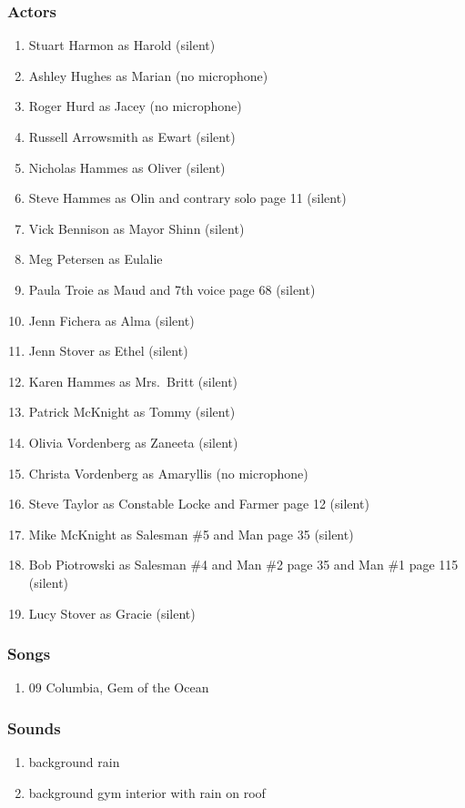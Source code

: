 \subsubsection{Actors}
\begin{enumerate}
\item Stuart Harmon as Harold (silent)
\item Ashley Hughes as Marian (no microphone)
\item Roger Hurd as Jacey (no microphone)
\item Russell Arrowsmith as Ewart (silent)
\item Nicholas Hammes as Oliver (silent)
\item Steve Hammes as Olin and contrary solo page 11 (silent)
\item Vick Bennison as Mayor Shinn (silent)
\item Meg Petersen as Eulalie
\item Paula Troie as Maud and 7th voice page 68 (silent)
\item Jenn Fichera as Alma (silent)
\item Jenn Stover as Ethel (silent)
\item Karen Hammes as Mrs.~Britt (silent)
\item Patrick McKnight as Tommy (silent)
\item Olivia Vordenberg as Zaneeta (silent)
\item Christa Vordenberg as Amaryllis (no microphone)
\item Steve Taylor as Constable Locke and Farmer page 12 (silent)
\item Mike McKnight as Salesman \#5 and Man page 35 (silent)
\item Bob Piotrowski as Salesman \#4 and Man \#2 page 35 and Man \#1 page 115 (silent)
\item Lucy Stover as Gracie (silent)
\end{enumerate}

\subsubsection{Songs}
\begin{enumerate}
\item 09 Columbia, Gem of the Ocean
\end{enumerate}\subsubsection{Sounds}
\begin{enumerate}
\item background rain
\item background gym interior with rain on roof
\end{enumerate}
